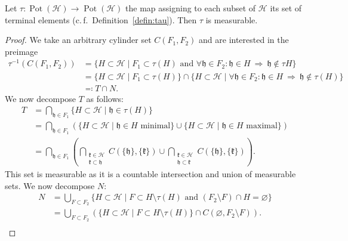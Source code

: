 \begin{lemma}
  \label{lem:tau}
   Let \(\tau\colon \operatorname{Pot}(\mathcal{H}) \to \operatorname{Pot}(\mathcal{H})\) the map assigning to each subset of \(\mathcal{H}\) its set of terminal elements (c.\,f.~Definition~\ref{defin:tau}). Then \(\tau\) is measurable.
\end{lemma}

\begin{proof}
  We take an arbitrary cylinder set \(C(F_1, F_2)\) and are interested in the preimage
  \begin{align*}
    \tau^{-1}(C(F_1, F_2))
    & = \{H \subset \mathcal{H} \mid F_1 \subset \tau(H) \text{ and } \forall \mathfrak{h} \in F_2\colon \mathfrak{h} \in H\ \Rightarrow\ \mathfrak{h} \not\in \tau{H}\} \\
    & = \{H \subset \mathcal{H} \mid F_1 \subset \tau(H)\} \cap \{H \subset \mathcal{H} \mid \forall \mathfrak{h} \in F_2\colon \mathfrak{h} \in H\ \Rightarrow\ \mathfrak{h} \not\in \tau(H)\}\\
    & \eqqcolon T \cap N.
  \end{align*}
  We now decompose \(T\) as follows:
  \begin{align*}
    T
    & = \bigcap_{\mathfrak{h} \in F_1}\{H \subset \mathcal{H} \mid \mathfrak{h} \in \tau(H)\}\\
    & = \bigcap_{\mathfrak{h} \in F_1}\left (\{H \subset \mathcal{H} \mid \mathfrak{h} \in H \text{ minimal}\} \cup \{H \subset \mathcal{H} \mid \mathfrak{h} \in H \text{ maximal}\}\right )\\
    & = \bigcap_{\mathfrak{h} \in F_1}\left ( \bigcap_{\substack{\mathfrak{k} \in \mathcal{H}\\\mathfrak{k} \subset \mathfrak{h}}}C(\{\mathfrak{h}\}, \{\mathfrak{k}\}) \cup \bigcap_{\substack{\mathfrak{k} \in \mathcal{H}\\\mathfrak{h} \subset\mathfrak{k}}} C(\{\mathfrak{h}\}, \{\mathfrak{k}\})\right ).
  \end{align*}
  This set is measurable as it is a countable intersection and union of measurable sets. We now decompose \(N\):
  \begin{align*}
    N
    & = \bigcup_{F \subset F_2} \{H \subset \mathcal{H} \mid F \subset H \setminus \tau(H) \text{ and } (F_2 \setminus F) \cap H = \varnothing\}\\
    & = \bigcup_{F \subset F_2} \left ( \{H \subset \mathcal{H} \mid F \subset H \setminus \tau(H)\} \cap C(\varnothing, F_2 \setminus F)\right).\\

\end{align*}
\end{proof}
